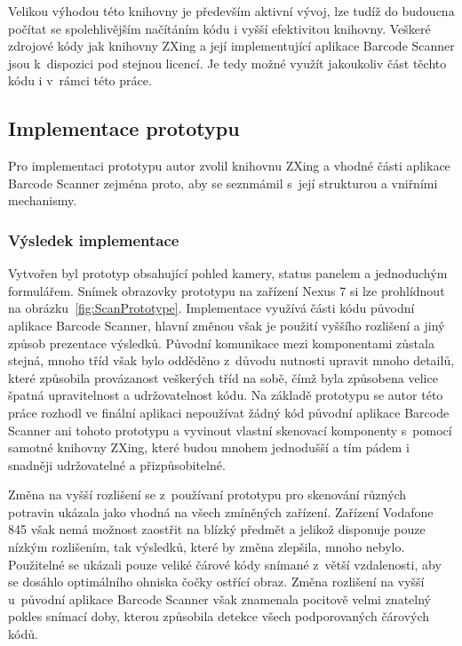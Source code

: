 \documentclass[thesis=B,czech]{FITthesis}[2013/10/20]
\begin{document}
Velikou výhodou této knihovny je především aktivní vývoj, lze tudíž do budoucna počítat se spolehlivějším načítáním kódu i vyšší efektivitou knihovny. Veškeré zdrojové kódy jak knihovny ZXing a její implementující aplikace Barcode Scanner jsou k~dispozici pod stejnou licencí. Je tedy možné využít jakoukoliv část těchto kódu i v~rámci této práce. 

\subsection{Implementace prototypu}

Pro implementaci prototypu autor zvolil knihovnu ZXing a vhodné části aplikace Barcode Scanner zejména proto, aby se seznmámil s~její strukturou a vniřními mechanismy. 

\subsubsection{Výsledek implementace}

Vytvořen byl prototyp obsahující pohled kamery, status panelem a jednoduchým formulářem. Snímek obrazovky prototypu na zařízení Nexus 7 si lze prohlídnout na obrázku~\ref{fig:ScanPrototype}. Implementace využívá části kódu původní aplikace Barcode Scanner, hlavní změnou však je použití vyššího rozlišení a jiný způsob prezentace výsledků. Původní komunikace mezi komponentami zůstala stejná, mnoho tříd však bylo odděděno z~důvodu nutnosti upravit mnoho detailů, které způsobila provázanost veškerých tříd na sobě, čímž byla způsobena velice špatná upravitelnost a udržovatelnost kódu. Na základě prototypu se autor této práce rozhodl ve finální aplikaci nepoužívat žádný kód původní aplikace Barcode Scanner ani tohoto prototypu a vyvinout vlastní skenovací komponenty s~pomocí samotné knihovny ZXing, které budou mnohem jednodušší a tím pádem i snadněji udržovatelné a přizpůsobitelné.

Změna na vyšší rozlišení se z~používaní prototypu pro skenování různých potravin ukázala jako vhodná na všech zmíněných zařízení. Zařízení Vodafone 845 však nemá možnost zaostřit na blízký předmět a jelikož disponuje pouze nízkým rozlišením, tak výsledků, které by změna zlepšila, mnoho nebylo. Použitelné se ukázali pouze veliké čárové kódy snímané z~větší vzdalenosti, aby se dosáhlo optimálního ohniska čočky ostřící obraz. Změna rozlišení na vyšší u~původní aplikace Barcode Scanner však znamenala pocitově velmi znatelný pokles snímací doby, kterou způsobila detekce všech podporovaných čárových kódů.
\end{document}
